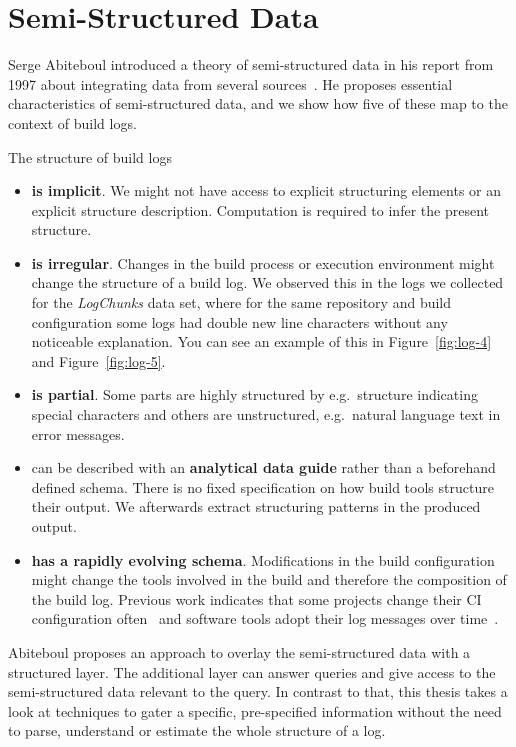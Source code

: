 \documentclass[\myrootdir/main.tex]{subfiles}
\begin{document}
\section{Semi-Structured Data}
\label{sec:rw-semi-structured-data}
Serge Abiteboul introduced a theory of semi-structured data in his report from 1997 about integrating data from several sources~\cite{abiteboul1997querying}.
He proposes essential characteristics of semi-structured data, and we show how five of these map to the context of build logs.

The structure of build logs
\begin{itemize}
  \item \textbf{is implicit}.
  We might not have access to explicit structuring elements or an explicit structure description.
  Computation is required to infer the present structure.
  \item \textbf{is irregular}.
  Changes in the build process or execution environment might change the structure of a build log.
  We observed this in the logs we collected for the \emph{LogChunks} data set, where for the same repository and build configuration some logs had double new line characters without any noticeable explanation.
  You can see an example of this in Figure~\ref{fig:log-4} and Figure~\ref{fig:log-5}.
  \item \textbf{is partial}. Some parts are highly structured by e.g.\ structure indicating special characters and others are unstructured, e.g.\ natural language text in error messages.
  \item can be described with an \textbf{analytical data guide} rather than a beforehand defined schema.
  There is no fixed specification on how build tools structure their output.
  We afterwards extract structuring patterns in the produced output.
  \item \textbf{has a rapidly evolving schema}.
  Modifications in the build configuration might change the tools involved in the build and therefore the composition of the build log.
  Previous work indicates that some projects change their CI configuration often~\cite{hilton2016usage} and software tools adopt their log messages over time~\cite{yuan2012characterizing}.
\end{itemize}

Abiteboul proposes an approach to overlay the semi-structured data with a structured layer.
The additional layer can answer queries and give access to the semi-structured data relevant to the query.
In contrast to that, this thesis takes a look at techniques to gater a specific, pre-specified information without the need to parse, understand or estimate the whole structure of a log.
\end{document}
